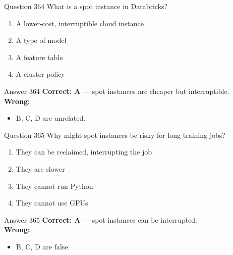 \documentclass[aspectratio=169,11pt]{beamer}
\begin{document}
	\begin{frame}{Question 364}
		What is a spot instance in Databricks?
		\begin{enumerate}[label=\Alph*.]
			\item A lower-cost, interruptible cloud instance
			\item A type of model
			\item A feature table
			\item A cluster policy
		\end{enumerate}
	\end{frame}
	\begin{frame}{Answer 364}
		\textbf{Correct: A} --- spot instances are cheaper but interruptible.\\
		\vspace{0.5em}
		\textbf{Wrong:}
		\begin{itemize}
			\item B, C, D are unrelated.
		\end{itemize}
	\end{frame}
	
	\begin{frame}{Question 365}
		Why might spot instances be risky for long training jobs?
		\begin{enumerate}[label=\Alph*.]
			\item They can be reclaimed, interrupting the job
			\item They are slower
			\item They cannot run Python
			\item They cannot use GPUs
		\end{enumerate}
	\end{frame}
	\begin{frame}{Answer 365}
		\textbf{Correct: A} --- spot instances can be interrupted.\\
		\vspace{0.5em}
		\textbf{Wrong:}
		\begin{itemize}
			\item B, C, D are false.
		\end{itemize}
	\end{frame}
	
\end{document}
